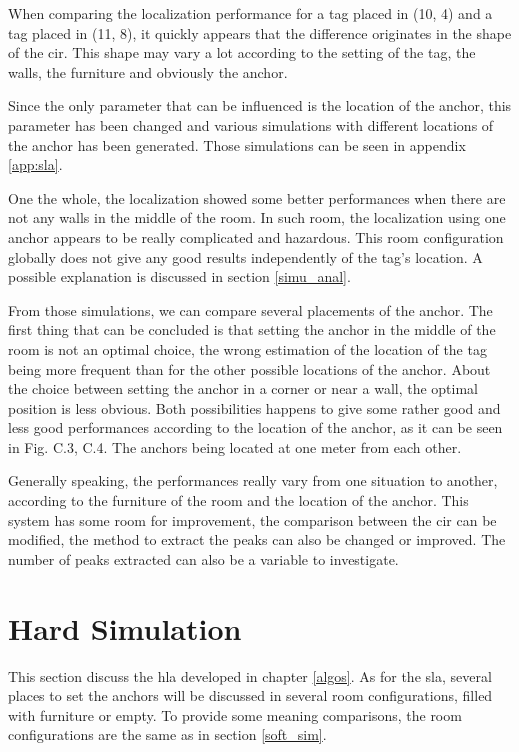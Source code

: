 When comparing the localization performance for a tag placed in (10, 4) and a tag placed in (11, 8), it quickly appears that the difference originates in the shape of the \gls{cir}. This shape may vary a lot according to the setting of the tag,  the walls, the furniture and obviously the anchor. 
\vspace{2mm}

Since the only parameter that can be influenced is the location of the anchor, this parameter has been changed and various simulations with different locations of the anchor has been generated. Those simulations can be seen in appendix \ref{app:sla}.
\vspace{2mm}

One the whole, the localization showed some better performances when there are not any walls in the middle of the room. In such room, the localization using one anchor appears to be really complicated and hazardous. This room configuration globally does not give any good results independently of the tag's location. A possible explanation is discussed in section \ref{simu_anal}.
\vspace{2mm}

From those simulations, we can compare several placements of the anchor. The first thing that can be concluded is that setting the anchor in the middle of the room is not an optimal choice, the wrong estimation of the location of the tag being more frequent than for the other possible locations of the anchor. About the choice between setting the anchor in a corner or near a wall, the optimal position is less obvious. Both possibilities happens to give some rather good and less good performances according to the location of the anchor, as it can be seen in Fig. C.3, C.4. The anchors being located at one meter from each other.
\vspace{2mm}

Generally speaking, the performances really vary from one situation to another, according  to the furniture of the room and the location of the anchor. This system has some room for improvement, the comparison between the \gls{cir} can be modified, the method to extract the peaks can also be changed or improved. The number of peaks extracted can also be a variable to investigate.


\section{Hard Simulation}

This section discuss the \gls{hla} developed in chapter \ref{algos}. As for the \gls{sla}, several places to set the anchors will be discussed in several room configurations, filled with furniture or empty. To provide some meaning comparisons, the room configurations are the same as in section \ref{soft_sim}.

